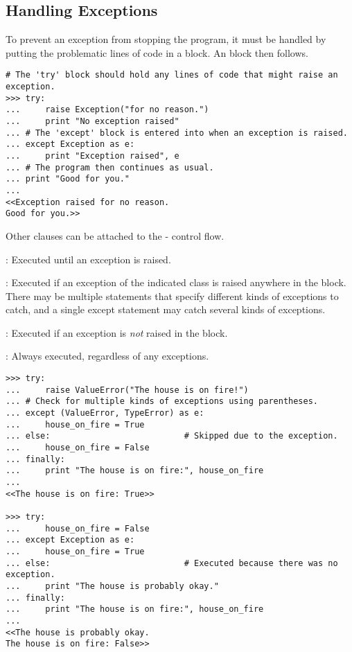 \subsection*{Handling Exceptions} %

To prevent an exception from stopping the program, it must be handled by
putting the problematic lines of code in a  block.
An  block then follows.

\begin{lstlisting}
# The 'try' block should hold any lines of code that might raise an exception.
>>> try:
...     raise Exception("for no reason.")
...     print "No exception raised"
... # The 'except' block is entered into when an exception is raised.
... except Exception as e:
...     print "Exception raised", e
... # The program then continues as usual.
... print "Good for you."
... 
<<Exception raised for no reason.
Good for you.>>
\end{lstlisting}

Other clauses can be attached to the - control flow.

\begin{description}
\item {}: Executed until an exception is raised.
\item {}: Executed if an exception of the indicated class is raised anywhere in the  block. There may be multiple  statements that specify different kinds of exceptions to catch, and a single except statement may catch several kinds of exceptions.
\item {}: Executed if an exception is \emph{not} raised in the  block.
\item {}: Always executed, regardless of any exceptions.
\end{description}


\begin{lstlisting}
>>> try:
...     raise ValueError("The house is on fire!")
... # Check for multiple kinds of exceptions using parentheses.
... except (ValueError, TypeError) as e:
...     house_on_fire = True
... else:                           # Skipped due to the exception.
...     house_on_fire = False
... finally:
...     print "The house is on fire:", house_on_fire
...
<<The house is on fire: True>>

>>> try:
...     house_on_fire = False
... except Exception as e:
...     house_on_fire = True
... else:                           # Executed because there was no exception.
...     print "The house is probably okay."
... finally:
...     print "The house is on fire:", house_on_fire
...
<<The house is probably okay.
The house is on fire: False>>
\end{lstlisting}

